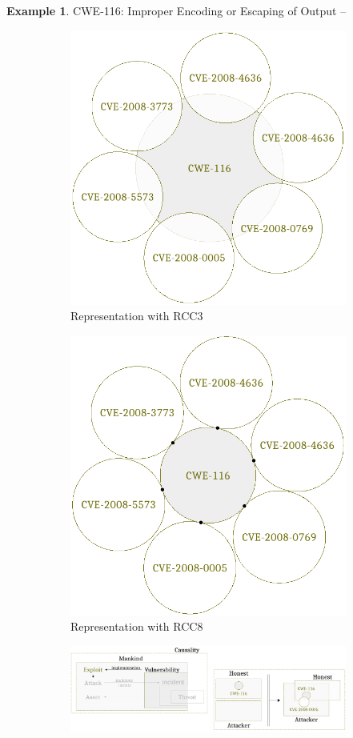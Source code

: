 \documentclass{article}
\theoremstyle{definition}
\theoremstyle{corollary}
\theoremstyle{lemma}
\theoremstyle{theorem}
\theoremstyle{theorem}
\newtheorem{example}{Example}
\begin{document}
\begin{example}{CWE-116: Improper Encoding or Escaping of Output\autocite{CWE-116} --}
\begin{figure}[t]
	\centering
	\begin{subfigure}[b]{.5\textwidth}
		\centering
		\includegraphics[width=.7\textwidth]{rcc5_CWE-116.pdf}
		\caption{Representation with RCC3}
		\label{fig:rcc5_CWE-116}
	\end{subfigure}\begin{subfigure}[b]{.5\textwidth}
		\centering
		\includegraphics[width=.7\textwidth]{rcc8_CWE-116.pdf}
		\caption{Representation with RCC8}
		\label{fig:rcc8_CWE-116}
	\end{subfigure}
	\begin{subfigure}[b]{\textwidth}
		\centering
		\includegraphics[width=\textwidth]{KML_CWE-116.pdf}

\end{subfigure}
\end{figure}
\end{example}
\end{document}
